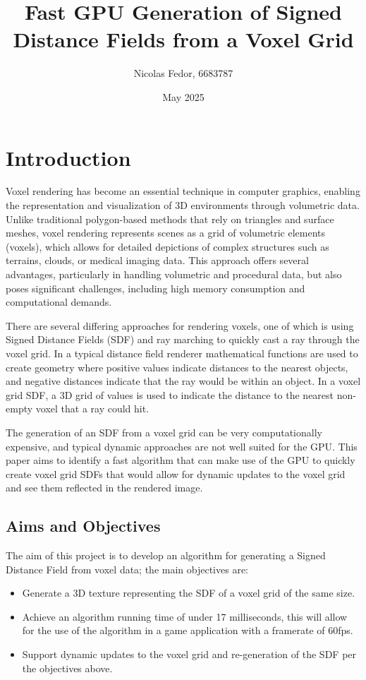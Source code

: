 \documentclass{article}
\title{Fast GPU Generation of Signed Distance Fields from a Voxel Grid}
\author{Nicolas Fedor, 6683787}
\date{May 2025}
\begin{document}
\maketitle

\section{Introduction}
Voxel rendering has become an essential technique in computer graphics, enabling the representation and visualization of 3D environments through volumetric data. Unlike traditional polygon-based methods that rely on triangles and surface meshes, voxel rendering represents scenes as a grid of volumetric elements (voxels), which allows for detailed depictions of complex structures such as terrains, clouds, or medical imaging data. This approach offers several advantages, particularly in handling volumetric and procedural data, but also poses significant challenges, including high memory consumption and computational demands.

There are several differing approaches for rendering voxels, one of which is using Signed Distance Fields (SDF) and ray marching to quickly cast a ray through the voxel grid. In a typical distance field renderer mathematical functions are used to create geometry where positive values indicate distances to the nearest objects, and negative distances indicate that the ray would be within an object. In a voxel grid SDF, a 3D grid of values is used to indicate the distance to the nearest non-empty voxel that a ray could hit.

The generation of an SDF from a voxel grid can be very computationally expensive, and typical dynamic approaches are not well suited for the GPU. This paper aims to identify a fast algorithm that can make use of the GPU to quickly create voxel grid SDFs that would allow for dynamic updates to the voxel grid and see them reflected in the rendered image.

\subsection{Aims and Objectives}
The aim of this project is to develop an algorithm for generating a Signed Distance Field from voxel data; the main objectives are:

\begin{itemize}
    \item Generate a 3D texture representing the SDF of a voxel grid of the same size.
    \item Achieve an algorithm running time of under 17 milliseconds, this will allow for the use of the algorithm in a game application with a framerate of 60fps.
    \item Support dynamic updates to the voxel grid and re-generation of the SDF per the objectives above.
\end{itemize}
\end{document}
